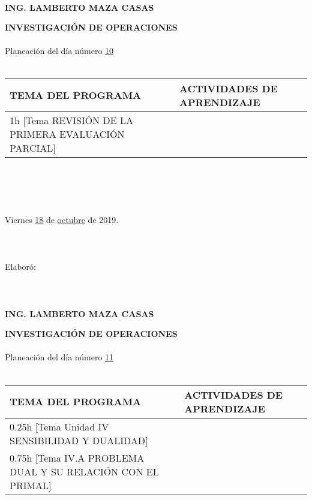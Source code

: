 \documentclass[landscape]{article}
\begin{document}
{\begin{center}
\ \\
{\bf ING. LAMBERTO MAZA CASAS}
\end{center}
\eject
\begin{center}
{\bf 
INVESTIGACI\'ON DE OPERACIONES
}
\ \\
\ \\
Planeaci\'on del d\'ia n\'umero \underline{\hspace{0.5cm}10\hspace{0.5cm}}
\ \\
\ \\
\begin{tabular}{|p{11cm}|p{8cm}|}\hline
{\bf TEMA DEL PROGRAMA}&{\bf ACTIVIDADES DE APRENDIZAJE}\\\hline
	1h	[Tema REVISI\'ON DE LA PRIMERA EVALUACI\'ON PARCIAL]
&\\
\hline
\end{tabular}
\ \\
\ \\
\ \\
\ \\
Viernes \underline{\hspace{0.5cm}18\hspace{0.5cm}} de  \underline{\hspace{0.5cm}octubre\hspace{0.5cm}} de 2019.
\ \\
\ \\
\ \\
\ \\
Elabor\'o:
\ \\
\ \\
\ \\
\ \\
{\bf ING. LAMBERTO MAZA CASAS}
\end{center}
\eject
\begin{center}
{\bf 
INVESTIGACI\'ON DE OPERACIONES
}
\ \\
\ \\
Planeaci\'on del d\'ia n\'umero \underline{\hspace{0.5cm}11\hspace{0.5cm}}
\ \\
\ \\
\begin{tabular}{|p{11cm}|p{8cm}|}\hline
{\bf TEMA DEL PROGRAMA}&{\bf ACTIVIDADES DE APRENDIZAJE}\\\hline
	0.25h	[Tema Unidad IV SENSIBILIDAD Y DUALIDAD]
&\\
	0.75h	[Tema IV.A PROBLEMA DUAL Y SU RELACI\'ON CON EL PRIMAL]
&\\

\end{tabular}
\end{center}}
\end{document}
